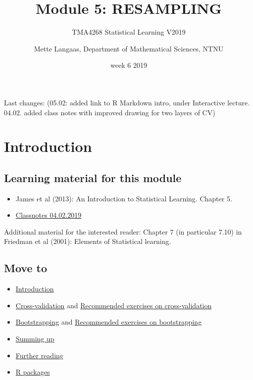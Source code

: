 \documentclass[]{article}
\title{Module 5: RESAMPLING}
\subtitle{TMA4268 Statistical Learning V2019}
\author{Mette Langaas, Department of Mathematical Sciences, NTNU}
\date{week 6 2019}
\providecommand{\tightlist}{%
  \setlength{\itemsep}{0pt}\setlength{\parskip}{0pt}}
\begin{document}
\maketitle

{
\setcounter{tocdepth}{2}
\tableofcontents
}
Last changes: (05.02: added link to R Markdown intro, under Interactive
lecture. 04.02. added class notes with improved drawing for two layers
of CV)

\hypertarget{introduction}{%
\section{ Introduction}\label{introduction}}

\hypertarget{learning-material-for-this-module}{%
\subsection{Learning material for this
module}\label{learning-material-for-this-module}}

\begin{itemize}
\tightlist
\item
  James et al (2013): An Introduction to Statistical Learning. Chapter
  5.
\item
  \href{https://www.math.ntnu.no/emner/TMA4268/2019v/notes/M5L1notes.pdf}{Classnotes
  04.02.2019}
\end{itemize}

Additional material for the interested reader: Chapter 7 (in particular
7.10) in Friedman et al (2001): Elements of Statistical learning.

\hypertarget{move-to}{%
\subsection{Move to}\label{move-to}}

\begin{itemize}
\tightlist
\item
  \protect\hyperlink{intro}{Introduction}
\item
  \protect\hyperlink{cv}{Cross-validation} and
  \protect\hyperlink{recexcv}{Recommended exercises on cross-validation}
\item
  \protect\hyperlink{boot}{Bootstrapping} and
  \protect\hyperlink{recexboot}{Recommended exercises on bootstrapping}
\item
  \protect\hyperlink{summing}{Summing up}
\item
  \protect\hyperlink{further}{Further reading}
\item
  \protect\hyperlink{Rpackages}{R packages}
\end{itemize}
\end{document}
